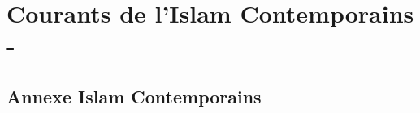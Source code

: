 \documentclass[oneside,10pt]{book} %
\begin{document}
\part{Courants de l'Islam Contemporains - }


%






















\chapter{Annexe Islam Contemporains}




\backmatter


%

\listoftheorems[ignoreall,show={Def}]

\end{document}
